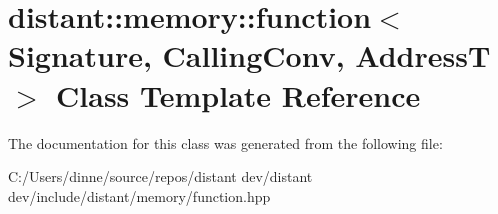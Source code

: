 \hypertarget{classdistant_1_1memory_1_1function}{}\section{distant\+:\+:memory\+:\+:function$<$ Signature, Calling\+Conv, AddressT $>$ Class Template Reference}
\label{classdistant_1_1memory_1_1function}


The documentation for this class was generated from the following file\+:\begin{DoxyCompactItemize}
\item 
C\+:/\+Users/dinne/source/repos/distant dev/distant dev/include/distant/memory/function.\+hpp\end{DoxyCompactItemize}
